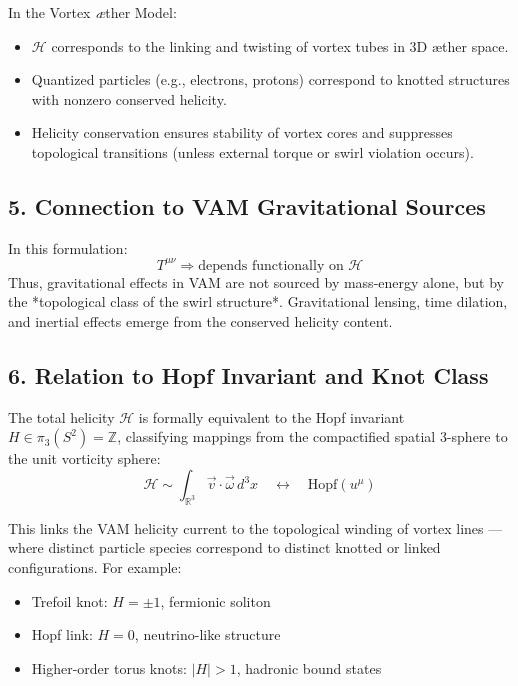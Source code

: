 \documentclass[twocolumn,aps,pre,floatfix,nofootinbib]{revtex4-2}
\begin{document}
    In the Vortex \textit{æ}ther Model:
    \begin{itemize}
        \item \( \mathcal{H} \) corresponds to the linking and twisting of vortex tubes in 3D æther space.
        \item Quantized particles (e.g., electrons, protons) correspond to knotted structures with nonzero conserved helicity.
        \item Helicity conservation ensures stability of vortex cores and suppresses topological transitions (unless external torque or swirl violation occurs).
    \end{itemize}

    \subsection*{5. Connection to VAM Gravitational Sources}

    In this formulation:
    \[
        T^{\mu\nu} \Rightarrow \text{depends functionally on } \mathcal{H}
    \]
    Thus, gravitational effects in VAM are not sourced by mass-energy alone, but by the *topological class of the swirl structure*. Gravitational lensing, time dilation, and inertial effects emerge from the conserved helicity content.

    \subsection*{6. Relation to Hopf Invariant and Knot Class}

    The total helicity \( \mathcal{H} \) is formally equivalent to the Hopf invariant \( H \in \pi_3(S^2) = \mathbb{Z} \), classifying mappings from the compactified spatial 3-sphere to the unit vorticity sphere:
    \begin{equation}
        \mathcal{H} \sim \int_{\mathbb{R}^3} \vec{v} \cdot \vec{\omega} \, d^3x \quad \longleftrightarrow \quad \text{Hopf}(u^\mu)
    \end{equation}

    This links the VAM helicity current to the topological winding of vortex lines — where distinct particle species correspond to distinct knotted or linked configurations. For example:
    \begin{itemize}
        \item Trefoil knot: \( H = \pm1 \), fermionic soliton
        \item Hopf link: \( H = 0 \), neutrino-like structure
        \item Higher-order torus knots: \( |H| > 1 \), hadronic bound states
    \end{itemize}
\end{document}

